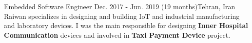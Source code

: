 \resumeSubheadingReza
{Embedded Software Engineer}{}
{Dec. 2017 - Jun. 2019 (19 months)}{Tehran, Iran}
{Raiwan specializes in designing and building IoT and industrial manufacturing and laboratory devices. I was the main responsible for designing \textbf{Inner Hospital Communication} devices and involved in \textbf{Taxi Payment Device} project.}
